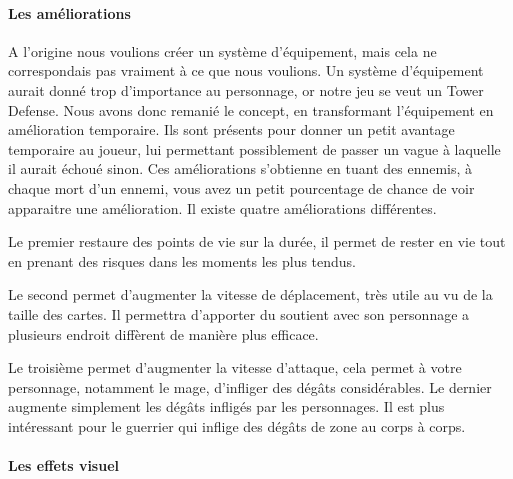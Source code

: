 \documentclass[a4paper, 12pt]{article}
\begin{document}
			\paragraph{Les améliorations}
			A l’origine nous voulions créer un système d’équipement, mais cela ne correspondais pas vraiment à ce que nous voulions. Un système d’équipement aurait donné trop d’importance au personnage, or notre jeu se veut un Tower Defense. Nous avons donc remanié le concept, en transformant l’équipement en  amélioration temporaire. Ils sont présents pour donner un petit avantage temporaire au joueur, lui permettant possiblement de passer un vague à laquelle il aurait échoué sinon. Ces améliorations s’obtienne en tuant des ennemis, à chaque mort d’un ennemi, vous avez un petit pourcentage de chance de voir apparaitre une amélioration. Il existe quatre améliorations différentes.
\par Le premier restaure des points de vie sur la durée, il permet de rester en vie tout en prenant des risques dans les moments les plus tendus.
\par Le second permet d’augmenter la vitesse de déplacement, très utile au vu de la taille des cartes. Il permettra d’apporter du soutient avec son personnage a plusieurs endroit diffèrent de manière plus efficace.
\par Le troisième permet d’augmenter la vitesse d’attaque, cela permet à votre personnage, notamment le mage, d’infliger des dégâts considérables.
Le dernier augmente simplement les dégâts infligés par les personnages. Il est plus intéressant pour le guerrier qui inflige des dégâts de zone au corps à corps.

			\paragraph{Les effets visuel}
			
\end{document}
